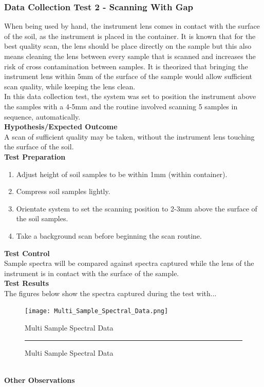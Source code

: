 \documentclass{UoNMCHA}
\numberwithin{equation}{section}
\begin{document}
\subsubsection{Data Collection Test 2 - Scanning With Gap}\label{subsub:Data Collection Test 2}
When being used by hand, the instrument lens comes in contact with the surface of the soil, as the instrument is placed in the container. It is known that for the best quality scan, the lens should be place directly on the sample but this also means cleaning the lens between every sample that is scanned and increases the risk of cross contamination between samples. It is theorized that bringing the instrument lens within 5mm of the surface of the sample would allow sufficient scan quality, while keeping the lens clean. \\
In this data collection test, the system was set to position the instrument above the samples with a 4-5mm and the routine involved scanning 5 samples in sequence, automatically.\\ 
\textbf{Hypothesis/Expected Outcome}\\
A scan of sufficient quality may be taken, without the instrument lens touching the surface of the soil. \\
\textbf{Test Preparation}\\
\begin{enumerate}
	\item Adjust height of soil samples to be within 1mm (within container).
	\item Compress soil samples lightly.
	\item Orientate system to set the scanning position to 2-3mm above the surface of the soil samples.
	\item Take a background scan before beginning the scan routine. 
\end{enumerate}
\textbf{Test Control}\\
Sample spectra will be compared against spectra captured while the lens of the instrument is in contact with the surface of the sample. \\
\textbf{Test Results}\\
The figures below show the spectra captured during the test with...\\
\begin{figure}[h]
	\centering
	\texttt{[image: Multi\_Sample\_Spectral\_Data.png]}
	\caption{Multi Sample Spectral Data}
	\label{fig:Multi Sample Spectral Data}
\end{figure}
\begin{figure}[h]
	\centering
	\rule{0.5\textwidth}{0.5\textwidth}%
	\caption{Multi Sample Spectral Data}
	\label{fig:Test Control Data}
\end{figure}\\
\textbf{Other Observations}\\
\end{document}
